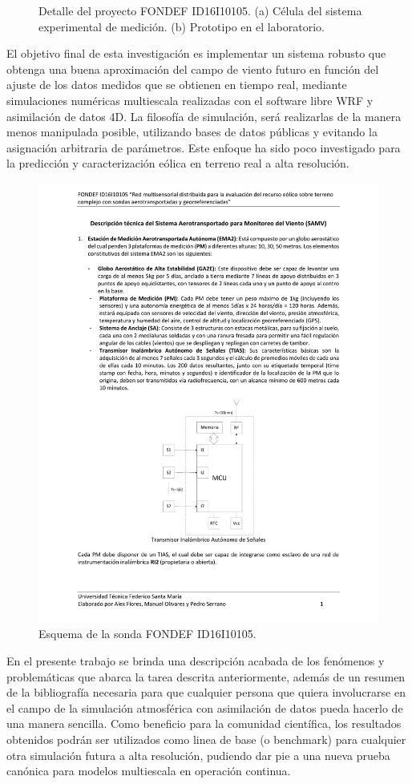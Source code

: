 \begin{figure}
\begin{minipage}{0.5\linewidth}
	\end{minipage}
	\caption{Detalle del proyecto FONDEF ID16I10105. (a) Célula del sistema experimental de medición. (b) Prototipo en el laboratorio.}
	\label{fig:01_detalle_fondef}
\end{figure}

El objetivo final de esta investigación es implementar un sistema robusto que obtenga una buena aproximación del campo de viento futuro en función del ajuste de los datos medidos que se obtienen en tiempo real, mediante simulaciones numéricas multiescala realizadas con el software libre WRF y asimilación de datos 4D. La filosofía de simulación, será realizarlas de la manera menos manipulada posible, utilizando bases de datos públicas y evitando la asignación arbitraria de parámetros. Este enfoque ha sido poco investigado para la predicción y caracterización eólica en terreno real a alta resolución. 

\begin{figure}[h!]
	\centering
	\includegraphics[width=0.82\linewidth,page=5,trim={3cm 2cm 2.3cm 3cm},clip]{Imagenes/01/descrp}
	\caption{Esquema de la sonda FONDEF ID16I10105.}
	\label{fig:01_sonda}
\end{figure}

En el presente trabajo se brinda una descripción acabada de los fenómenos y problemáticas que abarca la tarea descrita anteriormente, además de un resumen de la bibliografía necesaria para que cualquier persona que quiera involucrarse en el campo de la simulación atmosférica con asimilación de datos pueda hacerlo de una manera sencilla. Como beneficio para la comunidad científica, los resultados obtenidos podrán ser utilizados como linea de base (o benchmark) para cualquier otra simulación futura a alta resolución, pudiendo dar pie a una nueva prueba canónica para modelos multiescala en operación continua.

